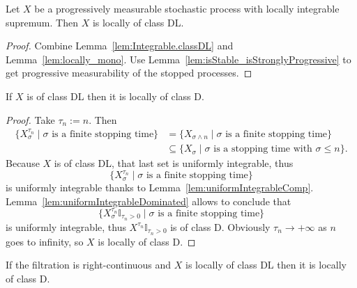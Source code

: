 \begin{lemma}\label{lem:HasLocallyIntegrableSup.locally_classDL}
  \leanok
Let $X$ be a progressively measurable stochastic process with locally integrable supremum. Then $X$ is locally of class DL.
\end{lemma}

\begin{proof}\leanok
Combine Lemma~\ref{lem:Integrable.classDL} and Lemma~\ref{lem:locally_mono}. Use Lemma~\ref{lem:isStable_isStronglyProgressive} to get progressive measurability of the stopped processes.
\end{proof}


\begin{lemma}\label{lem:ClassDL.locally_classD}
  \leanok
If $X$ is of class DL then it is locally of class D.
\end{lemma}

\begin{proof}
  \leanok
Take $\tau_n := n$. Then
\begin{align*}
  \{X^{\tau_n}_\sigma \mid \sigma \text{ is a finite stopping time}\} & = \{X_{\sigma \land n} \mid \sigma \text{ is a finite stopping time}\} \\
  & \subseteq \{X_\sigma \mid \sigma \text{ is a stopping time with } \sigma \le n\}.
\end{align*}
Because $X$ is of class DL, that last set is uniformly integrable, thus
$$\{X^{\tau_n}_\sigma \mid \sigma \text{ is a finite stopping time}\}$$
is uniformly integrable thanks to Lemma~\ref{lem:uniformIntegrableComp}. Lemma~\ref{lem:uniformIntegrableDominated} allows to conclude that
$$\{X^{\tau_n}_\sigma \mathbb{I}_{\tau_n > 0} \mid \sigma \text{ is a finite stopping time}\}$$
is uniformly integrable, thus $X^{\tau_n} \mathbb{I}_{\tau_n > 0}$ is of class D. Obviously $\tau_n \rightarrow +\infty$ as $n$ goes to infinity, so $X$ is locally of class D.
\end{proof}


\begin{lemma}\label{lem:locally_classD_of_locally_classDL}
  \leanok
If the filtration is right-continuous and $X$ is locally of class DL then it is locally of class D.
\end{lemma}

